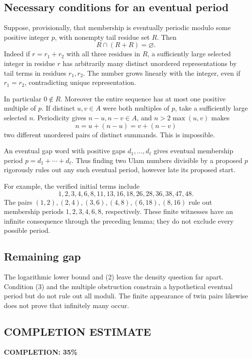 \subsection*{Necessary conditions for an eventual period}
Suppose, provisionally, that membership is eventually periodic modulo some positive integer $p$, with nonempty tail residue set $R$. Then
\[
 R\cap(R+R)=\varnothing. \tag{3}
\]
Indeed if $r=r_1+r_2$ with all three residues in $R$, a sufficiently large selected integer in residue $r$ has arbitrarily many distinct unordered representations by tail terms in residues $r_1,r_2$. The number grows linearly with the integer, even if $r_1=r_2$, contradicting unique representation.

In particular $0\notin R$. Moreover the entire sequence has at most one positive multiple of $p$. If distinct $u,v\in A$ were both multiples of $p$, take a sufficiently large selected $n$. Periodicity gives $n-u,n-v\in A$, and $n>2\max(u,v)$ makes
\[
 n=u+(n-u)=v+(n-v)
\]
two different unordered pairs of distinct summands. This is impossible.

An eventual gap word with positive gaps $d_1,\ldots,d_\ell$ gives eventual membership period $p=d_1+\cdots+d_\ell$. Thus finding two Ulam numbers divisible by a proposed $p$ rigorously rules out any such eventual period, however late its proposed start.

For example, the verified initial terms include
\[
 1,2,3,4,6,8,11,13,16,18,26,28,36,38,47,48.
\]
The pairs $(1,2),(2,4),(3,6),(4,8),(6,18),(8,16)$ rule out membership periods $1,2,3,4,6,8$, respectively. These finite witnesses have an infinite consequence through the preceding lemma; they do not exclude every possible period.

\subsection*{Remaining gap}
The logarithmic lower bound and (2) leave the density question far apart. Condition (3) and the multiple obstruction constrain a hypothetical eventual period but do not rule out all moduli. The finite appearance of twin pairs likewise does not prove that infinitely many occur.
\subsection*{COMPLETION ESTIMATE}
\textbf{COMPLETION: 35\%}
